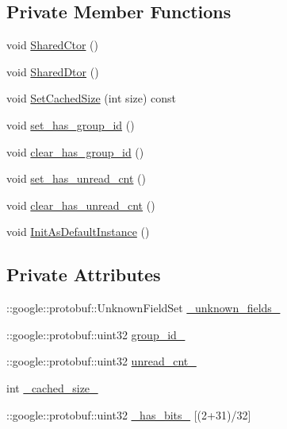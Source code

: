 \subsection*{Private Member Functions}
\begin{DoxyCompactItemize}
\item 
void \hyperlink{class_i_m_1_1_base_define_1_1_server_group_un_read_cnt_a70c692b5ea1e38d46195ee916f76d3d2}{Shared\+Ctor} ()
\item 
void \hyperlink{class_i_m_1_1_base_define_1_1_server_group_un_read_cnt_a538b71742bcf6874ba6bdf7de694c857}{Shared\+Dtor} ()
\item 
void \hyperlink{class_i_m_1_1_base_define_1_1_server_group_un_read_cnt_a423bfb82d243fc8b8bfd405a9c0e0d81}{Set\+Cached\+Size} (int size) const 
\item 
void \hyperlink{class_i_m_1_1_base_define_1_1_server_group_un_read_cnt_acca82ef1ba0c3368a6bc0ef208f9df9a}{set\+\_\+has\+\_\+group\+\_\+id} ()
\item 
void \hyperlink{class_i_m_1_1_base_define_1_1_server_group_un_read_cnt_a6cfd485df9fd9c9ec803944e0cc95a5e}{clear\+\_\+has\+\_\+group\+\_\+id} ()
\item 
void \hyperlink{class_i_m_1_1_base_define_1_1_server_group_un_read_cnt_a326110d8c2ec5531d56ec456d5bbf384}{set\+\_\+has\+\_\+unread\+\_\+cnt} ()
\item 
void \hyperlink{class_i_m_1_1_base_define_1_1_server_group_un_read_cnt_ab49f3d205bb3cfd69f01924d5909f863}{clear\+\_\+has\+\_\+unread\+\_\+cnt} ()
\item 
void \hyperlink{class_i_m_1_1_base_define_1_1_server_group_un_read_cnt_af9e4c1bd8499435da2580d65521379c7}{Init\+As\+Default\+Instance} ()
\end{DoxyCompactItemize}
\subsection*{Private Attributes}
\begin{DoxyCompactItemize}
\item 
\+::google\+::protobuf\+::\+Unknown\+Field\+Set \hyperlink{class_i_m_1_1_base_define_1_1_server_group_un_read_cnt_aa5d2c10ced591386b32df846b9845b10}{\+\_\+unknown\+\_\+fields\+\_\+}
\item 
\+::google\+::protobuf\+::uint32 \hyperlink{class_i_m_1_1_base_define_1_1_server_group_un_read_cnt_ac91dffa0008106f4d0de59501e6e287e}{group\+\_\+id\+\_\+}
\item 
\+::google\+::protobuf\+::uint32 \hyperlink{class_i_m_1_1_base_define_1_1_server_group_un_read_cnt_ab3b31a4f332f4819f601f72c4219ca9f}{unread\+\_\+cnt\+\_\+}
\item 
int \hyperlink{class_i_m_1_1_base_define_1_1_server_group_un_read_cnt_a07a6085c3224e964db716127b465537a}{\+\_\+cached\+\_\+size\+\_\+}
\item 
\+::google\+::protobuf\+::uint32 \hyperlink{class_i_m_1_1_base_define_1_1_server_group_un_read_cnt_a91b1d1a76b4ce1a7666eaa80a18d68b8}{\+\_\+has\+\_\+bits\+\_\+} \mbox{[}(2+31)/32\mbox{]}
\end{DoxyCompactItemize}
